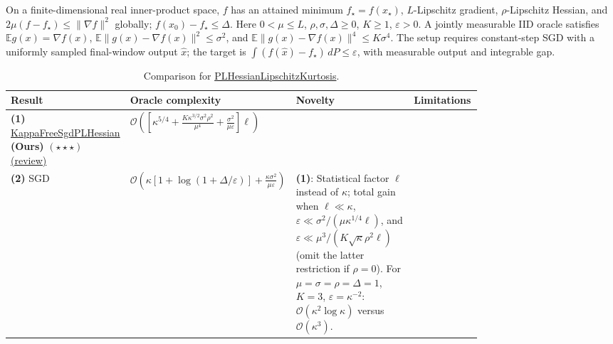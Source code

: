 \begin{table}[tp]
\centering
\caption{Comparison for \href{https://github.com/k3nfalt/longtails/blob/main/LongTails/Setups/PLHessianLipschitzKurtosis.lean}{PLHessianLipschitzKurtosis}.}\label{tab:PLHessianLipschitzKurtosis}
\parbox{\linewidth}{\footnotesize On a finite-dimensional real inner-product space, $f$ has an attained minimum $f_\star=f(x_\star)$, $L$-Lipschitz gradient, $\rho$-Lipschitz Hessian, and $2\mu(f-f_\star)\leq\|\nabla f\|^2$ globally; $f(x_0)-f_\star\leq\Delta$. Here $0<\mu\leq L$, $\rho,\sigma,\Delta\geq0$, $K\geq1$, $\varepsilon>0$. A jointly measurable IID oracle satisfies $\mathbb E g(x)=\nabla f(x)$, $\mathbb E\|g(x)-\nabla f(x)\|^2\leq\sigma^2$, and $\mathbb E\|g(x)-\nabla f(x)\|^4\leq K\sigma^4$. The setup requires constant-step SGD with a uniformly sampled final-window output $\hat x$; the target is $\int(f(\hat x)-f_\star)\,dP\leq\varepsilon$, with measurable output and integrable gap.}\par\smallskip
\begin{threeparttable}
\footnotesize
\setlength{\tabcolsep}{4pt}\renewcommand{\arraystretch}{1.25}
\begin{tabularx}{\linewidth}{@{}>{\raggedright\arraybackslash}p{0.20\linewidth}>{\raggedright\arraybackslash}p{0.32\linewidth}>{\raggedright\arraybackslash}p{0.25\linewidth}>{\raggedright\arraybackslash}X@{}}
\toprule
\textbf{Result} & \textbf{Oracle complexity} & \textbf{Novelty} & \textbf{Limitations} \\
\midrule
\textbf{(1)} \href{https://github.com/k3nfalt/longtails/blob/main/LongTails/Theorems/KappaFreeSgdPLHessian.lean}{Kappa\allowbreak Free\allowbreak Sgd\allowbreak PL\allowbreak Hessian} \textbf{(Ours)} $(\star\star\star)$ \href{https://github.com/k3nfalt/longtails/blob/main/scripts/reviews/KappaFreeSgdPLHessian.md}{(review)}
& $\mathcal{O}\!\left(\left[\kappa^{5/4}+\frac{K\kappa^{3/2}\sigma^2\rho^2}{\mu^4}+\frac{\sigma^2}{\mu\varepsilon}\right]\ell\right)$ & & \\
\midrule[1.2pt]
\textbf{(2)} SGD \citep[Thm.~3, Cor.~2]{avmsKhaledRichtarik2020v3}
& $\mathcal{O}\!\left(\kappa[1+\log(1+\Delta/\varepsilon)]+\frac{\kappa\sigma^2}{\mu\varepsilon}\right)$
& \textbf{(1)}: Statistical factor $\ell$ instead of $\kappa$; total gain when $\ell\ll\kappa$, $\varepsilon\ll\sigma^2/(\mu\kappa^{1/4}\ell)$, and $\varepsilon\ll\mu^3/(K\sqrt\kappa\rho^2\ell)$ (omit the latter restriction if $\rho=0$). For $\mu=\sigma=\rho=\Delta=1$, $K=3$, $\varepsilon=\kappa^{-2}$: $\mathcal{O}(\kappa^2\log\kappa)$ versus $\mathcal{O}(\kappa^3)$.

\end{tabularx}
\end{threeparttable}
\end{table}
